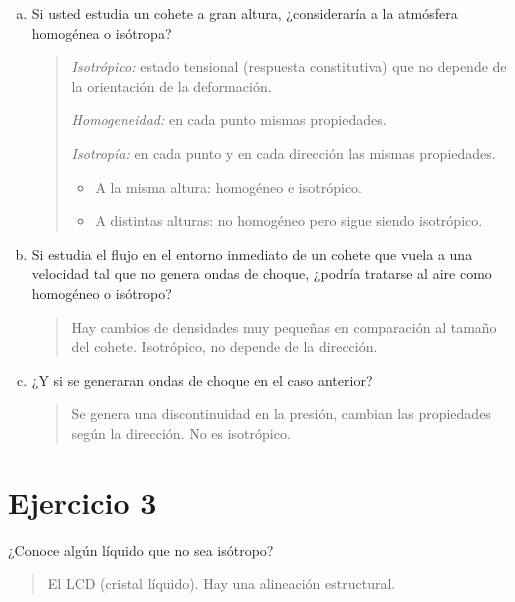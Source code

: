 \documentclass[a4paper,10pt,twoside,final,spanish]{article}
\begin{document}
\begin{enumerate}[a.]
\item Si usted estudia un cohete a gran altura, ¿consideraría a la atmósfera homogénea o isótropa?

\begin{quote}
\textit{Isotrópico:} estado tensional (respuesta constitutiva) que no depende de la orientación de la deformación.

\textit{Homogeneidad:} en cada punto mismas propiedades.

\textit{Isotropía:} en cada punto y en cada dirección las mismas propiedades.

\begin{itemize}
\item A la misma altura: homogéneo e isotrópico.

\item A distintas alturas: no homogéneo pero sigue siendo isotrópico.
\end{itemize}  
\end{quote}

\item Si estudia el flujo en el entorno inmediato de un cohete que vuela a una velocidad tal que no genera ondas de choque, ¿podría tratarse al aire como homogéneo o isótropo?

\begin{quote}
Hay cambios de densidades muy pequeñas en comparación al tamaño del cohete. Isotrópico, no depende de la dirección.
\end{quote}

\item ¿Y si se generaran ondas de choque en el caso anterior? 

\begin{quote}
Se genera una discontinuidad en la presión, cambian las propiedades según la dirección. No es isotrópico.
\end{quote}

\end{enumerate}

\section*{Ejercicio 3}

¿Conoce algún líquido que no sea isótropo? 

\dotfill

\begin{quote}
El LCD (cristal líquido). Hay una alineación estructural.
\end{quote}
\end{document}
